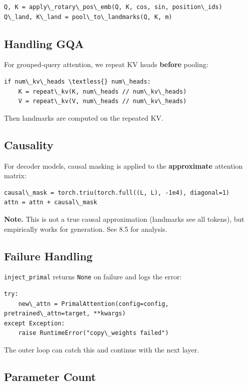 \begin{lstlisting}
Q, K = apply\_rotary\_pos\_emb(Q, K, cos, sin, position\_ids)
Q\_land, K\_land = pool\_to\_landmarks(Q, K, m)
\end{lstlisting}

\subsection{Handling GQA}

For grouped-query attention, we repeat KV heads \textbf{before} pooling:

\begin{lstlisting}
if num\_kv\_heads \textless{} num\_heads:
    K = repeat\_kv(K, num\_heads // num\_kv\_heads)
    V = repeat\_kv(V, num\_heads // num\_kv\_heads)
\end{lstlisting}

Then landmarks are computed on the repeated KV.

\subsection{Causality}

For decoder models, causal masking is applied to the \textbf{approximate} attention 
matrix:

\begin{lstlisting}
causal\_mask = torch.triu(torch.full((L, L), -1e4), diagonal=1)
attn = attn + causal\_mask
\end{lstlisting}

\textbf{Note.} This is not a true causal approximation (landmarks see all tokens), 
but empirically works for generation. See  8.5 for analysis.

\subsection{Failure Handling}

\texttt{inject\_primal} returns \texttt{None} on failure and logs the error:

\begin{lstlisting}
try:
    new\_attn = PrimalAttention(config=config, pretrained\_attn=target, **kwargs)
except Exception:
    raise RuntimeError("copy\_weights failed")
\end{lstlisting}

The outer loop can catch this and continue with the next layer.

\subsection{Parameter Count}

